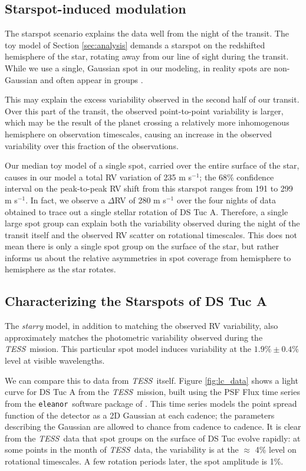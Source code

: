 \documentclass[twocolumn]{aastex63}
\newcommand{\tess}{{\it TESS}}
\newcommand{\eleanor}{\texttt{eleanor}}
\begin{document}
\subsection{Starspot-induced modulation}

The starspot scenario explains the data well from the night of the transit.
The toy model of Section \ref{sec:analysis} demands a starspot on the redshifted hemisphere of the star, rotating away from our line of sight during the transit. 
While we use a single, Gaussian spot in our modeling, in reality spots are non-Gaussian and often appear in groups \citep[e.g.][]{Kilcik11}.

This may explain the excess variability observed in the second half of our transit. 
Over this part of the transit, the observed point-to-point variability is larger, which may be the result of the planet crossing a relatively more inhomogenous hemisphere on observation timescales, causing an increase in the observed variability over this fraction of the observations.

Our median toy model of a single spot, carried over the entire surface of the star, causes in our model a total RV variation of 235 m s$^{-1}$; the 68\% confidence interval on the peak-to-peak RV shift from this starspot ranges from 191 to 299 m s$^{-1}$.
In fact, we observe a $\Delta$RV of 280 m s$^{-1}$ over the four nights of data obtained to trace out a single stellar rotation of DS Tuc A.
Therefore, a single large spot group can explain both the variability observed during the night of the transit itself and the observed RV scatter on rotational timescales.
This does not mean there is only a single spot group on the surface of the star, but rather informs us about the relative asymmetries in spot coverage from hemisphere to hemisphere as the star rotates.


\subsection{Characterizing the Starspots of DS Tuc A}
The \textit{starry} model, in addition to matching the observed RV variability, also approximately matches the photometric variability observed during the \tess\ mission. 
This particular spot model induces variability at the $1.9\% \pm 0.4\%$ level at visible wavelengths.

We can compare this to data from \tess\ itself. 
Figure \ref{fig:lc_data} shows a light curve for DS Tuc A from the \tess\ mission, built using the PSF Flux time series from the \eleanor\ software package of \citet{Feinstein19}. This time series models the point spread function of the detector as a 2D Gaussian at each cadence; the parameters describing the Gaussian are allowed to chance from cadence to cadence. 
It is clear from the \tess\ data that spot groups on the surface of DS Tuc evolve rapidly: at some points in the month of \tess\ data, the variability is at the $\approx$ 4\% level on rotational timescales. 
A few rotation periods later, the spot amplitude is 1\%. 
\end{document}
